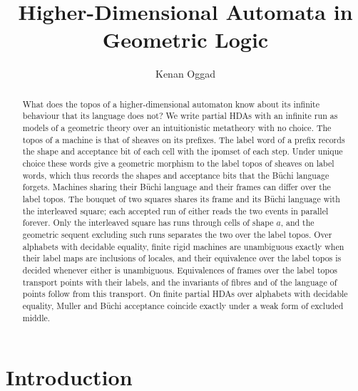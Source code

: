 \documentclass{lmcs}
\theoremstyle{definition}
\theoremstyle{remark}
\begin{document}
\title{Higher-Dimensional Automata in Geometric Logic}
\author{Kenan Oggad}
\address{Universit\'{e} Paris-Saclay}

\begin{abstract}
What does the topos of a higher-dimensional automaton know about its infinite behaviour that its language does
not? We write partial HDAs with an infinite run as models of a geometric theory over an intuitionistic metatheory
with no choice. The topos of a machine is that of sheaves on its prefixes. The label word of a prefix records the
shape and acceptance bit of each cell with the ipomset of each step. Under unique choice these words give a geometric
morphism to the label topos of sheaves on label words, which thus records the shapes and acceptance bits that the B\"uchi language forgets. Machines sharing their B\"uchi language and their frames can differ over the label topos. The bouquet of two squares shares its frame and its B\"uchi language with the interleaved square; each accepted run of either reads the two events in parallel forever. Only the interleaved square has runs
through cells of shape $a$, and the geometric sequent excluding such runs separates the two over the label topos. Over alphabets with decidable equality, finite rigid machines are
unambiguous exactly when their label maps are inclusions of locales, and their equivalence over the label topos is decided
whenever either is unambiguous. Equivalences of frames over the label topos transport points with their labels, and the invariants of fibres and of the language of points follow from this transport. On finite partial HDAs over alphabets with decidable equality, Muller and B\"uchi acceptance coincide exactly under a weak form of excluded middle.
\end{abstract}

\maketitle

\section{Introduction}\label{sec:intro}
\end{document}
